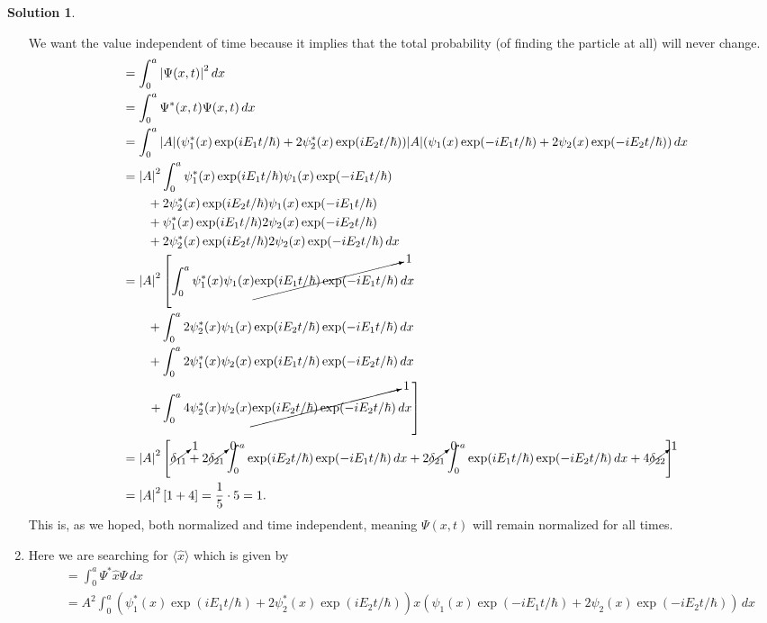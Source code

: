 \documentclass[10pt]{article}
\theoremstyle{definition}
\newtheorem{soln}{Solution}
\begin{document}
\begin{soln}
\begin{enumerate}[label=(\alph*)]
    We want the value independent of time because it implies that the total probability (of finding the particle at all) will never change.
    \begin{align*}
      &=\int_{0}^{a}\abs{\Psi(x,t)}^2\,dx\\
      &=\int_{0}^{a}\Psi^*(x,t)\Psi(x,t)\,dx\\
      &=\int_{0}^{a}\abs{A}(\psi_1^*(x)\exp(iE_1t/\hbar)+2\psi_2^*(x)\exp(iE_2t/\hbar))\abs{A}(\psi_1(x)\exp(-iE_1t/\hbar)+2\psi_2(x)\exp(-iE_2t/\hbar))\,dx\\
      &=\abs{A}^2\int_{0}^{a}
      \psi_1^*(x)\exp(iE_1t/\hbar)\psi_1(x)\exp(-iE_1t/\hbar)\\
      &\qquad+2\psi_2^*(x)\exp(iE_2t/\hbar)\psi_1(x)\exp(-iE_1t/\hbar)\\
      &\qquad+\psi_1^*(x)\exp(iE_1t/\hbar)2\psi_2(x)\exp(-iE_2t/\hbar)\\
      &\qquad+2\psi_2^*(x)\exp(iE_2t/\hbar)2\psi_2(x)\exp(-iE_2t/\hbar)
      \,dx\\
            &=\abs{A}^2\left[
      \int_{0}^{a}\psi_1^*(x)\psi_1(x)\cancelto{1}{\exp(iE_1t/\hbar)\exp(-iE_1t/\hbar)}\,dx\right.\\
      &\qquad+\int_{0}^{a}2\psi_2^*(x)\psi_1(x)\exp(iE_2t/\hbar)\exp(-iE_1t/\hbar)\,dx\\
      &\qquad+\int_{0}^{a}2\psi_1^*(x)\psi_2(x)\exp(iE_1t/\hbar)\exp(-iE_2t/\hbar)\,dx\\
      &\left.\qquad+\int_{0}^{a}4\psi_2^*(x)\psi_2(x)\cancelto{1}{\exp(iE_2t/\hbar)\exp(-iE_2t/\hbar)}
      \,dx\right]\\
      &=\abs{A}^2\left[
      \cancelto{1}{\delta_{11}}
      +2\cancelto{0}{\delta_{21}}\int_{0}^{a}\exp(iE_2t/\hbar)\exp(-iE_1t/\hbar)\,dx
      +2\cancelto{0}{\delta_{21}}\int_{0}^{a}\exp(iE_1t/\hbar)\exp(-iE_2t/\hbar)\,dx
      +4\cancelto{1}{\delta_{22}}\right]\\
      &=\abs{A}^2\left[1+4\right]=\frac{1}{5}\cdot 5=1.
    \end{align*}
    This is, as we hoped, both normalized and time independent, meaning $\Psi(x,t)$ will remain normalized for all times.
    \item Here we are searching for $\langle \hat{x}\rangle$ which is given by 
    \begin{align*}
      &=\int_{0}^{a}\Psi^*\hat{x}\Psi\,dx\\
      &=A^2\int_{0}^{a}(\psi_1^*(x)\exp(iE_1t/\hbar)+2\psi_2^*(x)\exp(iE_2t/\hbar))x(\psi_1(x)\exp(-iE_1t/\hbar)+2\psi_2(x)\exp(-iE_2t/\hbar))\,dx\\

\end{align*}
\end{enumerate}
\end{soln}
\end{document}
